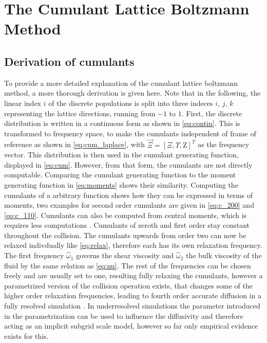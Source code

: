 \chapter{The Cumulant Lattice Boltzmann Method}
\label{app:cumulant}
\section{Derivation of cumulants}
To provide a more detailed explanation of the cumulant lattice boltzmann method, a more thorough derivation is given here. Note that in the following, the linear index $i$ of the discrete populations is split into three indeces $i$, $j$, $k$ representing the lattice directions, running from $-1$ to $1$. First, the discrete distribution is written in a continuous form as shown in \eqref{eq:contin}. This is transformed to frequency space, to make the cumulants independent of frame of reference as shown in \eqref{eq:cum_laplace}, with $\vec{\Xi} = [\Xi, \Upsilon, \mathrm{Z}]^T$ as the frequency vector. This distribution is then used in the cumulant generating function, displayed in \eqref{eq:cum}. However, from that form, the cumulants are not directly computable. Comparing the cumulant generating function to the moment generating function in \eqref{eq:moments} shows their similarity. Computing the cumulants of a arbitrary function shows how they can be expressed in terms of moments, two examples for second order cumulants are given in \eqref{eq:c_200} and \eqref{eq:c_110}. Cumulants can also be computed from central moments, which is requires less computations \cite{geier_cumulant_2015}. Cumulants of zeroth and first order stay constant throughout the collision. The cumulants upwards from order two can now be relaxed indivdually like \eqref{eq:relax}, therefore each has its own relaxation frequency. The first frequency $\hat{\omega}_1$ governs the shear viscosity and $\hat{\omega}_2$ the bulk viscosity of the fluid by the same relation as \eqref{eq:nu}. The rest of the frequencies can be chosen freely and are usually set to one, resulting fully relaxing the cumulants, however a parametrized version of the collision operation exists, that changes some of the higher order relaxation frequencies, leading to fourth order accurate diffusion in a fully resolved simulation \cite{geier_parametrization_2017}. In underresolved simulations the parameter introduced in the parametrization can be used to influence the diffusivity and therefore acting as an implicit subgrid scale model, however so far only empirical evidence exists for this.\cite{geier_cumulant_2015} 
